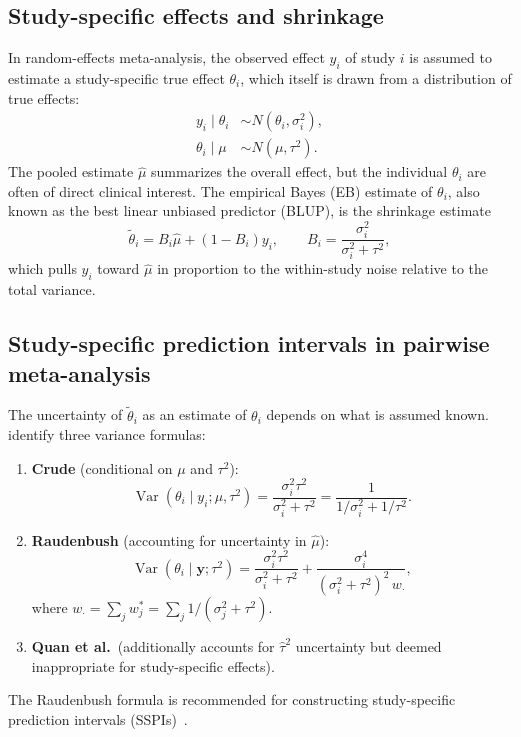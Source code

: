 \documentclass[12pt]{article}
\newcommand{\Var}{\operatorname{Var}}
\begin{document}
\subsection{Study-specific effects and shrinkage}

In random-effects meta-analysis, the observed effect $y_i$ of study $i$
is assumed to estimate a study-specific true effect $\theta_i$, which
itself is drawn from a distribution of true effects:
\begin{align}
  y_i \mid \theta_i &\sim N(\theta_i, \sigma_i^2), \label{eq:likelihood}\\
  \theta_i \mid \mu &\sim N(\mu, \tau^2). \label{eq:prior}
\end{align}
The pooled estimate $\hat\mu$ summarizes the overall effect, but the
individual $\theta_i$ are often of direct clinical interest.  The
empirical Bayes (EB) estimate of $\theta_i$, also known as the best
linear unbiased predictor (BLUP), is the shrinkage estimate
\begin{equation}\label{eq:eb}
  \tilde\theta_i = B_i \hat\mu + (1 - B_i) y_i,
  \qquad B_i = \frac{\sigma_i^2}{\sigma_i^2 + \tau^2},
\end{equation}
which pulls $y_i$ toward $\hat\mu$ in proportion to the within-study
noise relative to the total variance.

\subsection{Study-specific prediction intervals in pairwise meta-analysis}

The uncertainty of $\tilde\theta_i$ as an estimate of $\theta_i$
depends on what is assumed known.  \citet{vanAert2021} identify three
variance formulas:
\begin{enumerate}
  \item \textbf{Crude} (conditional on $\mu$ and $\tau^2$):
    \begin{equation}\label{eq:crude}
      \Var(\theta_i \mid y_i; \mu, \tau^2)
        = \frac{\sigma_i^2 \tau^2}{\sigma_i^2 + \tau^2}
        = \frac{1}{1/\sigma_i^2 + 1/\tau^2}.
    \end{equation}
  \item \textbf{Raudenbush} (accounting for uncertainty in $\hat\mu$):
    \begin{equation}\label{eq:raudenbush}
      \Var(\theta_i \mid \mathbf{y}; \tau^2)
        = \frac{\sigma_i^2 \tau^2}{\sigma_i^2 + \tau^2}
        + \frac{\sigma_i^4}{(\sigma_i^2 + \tau^2)^2 \, w_{\cdot}},
    \end{equation}
    where $w_{\cdot} = \sum_j w_j^* = \sum_j 1/(\sigma_j^2 + \tau^2)$.
  \item \textbf{Quan et al.}\ (additionally accounts for $\hat\tau^2$
    uncertainty but deemed inappropriate for study-specific effects).
\end{enumerate}
The Raudenbush formula is recommended for constructing study-specific
prediction intervals (SSPIs)~\citep{vanAert2021}.
\end{document}
